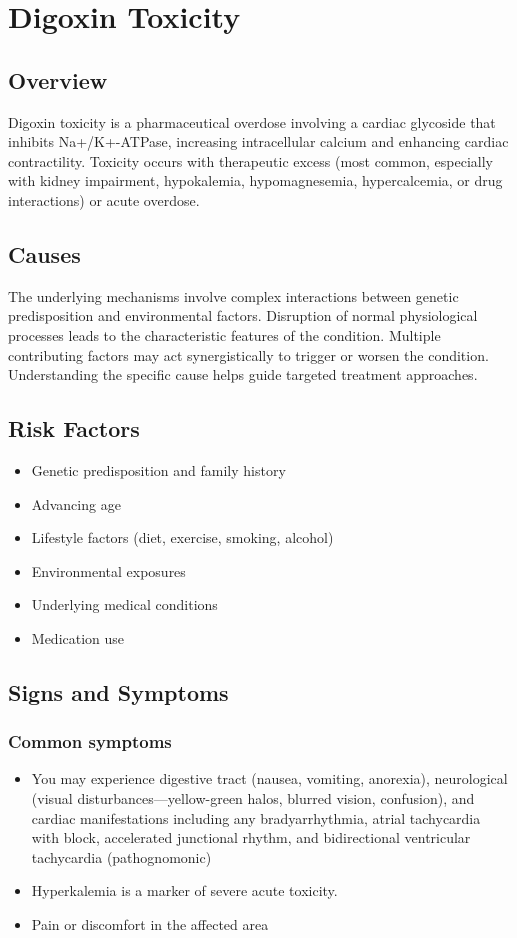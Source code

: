 \chapter{Digoxin Toxicity}
\label{sec:Digoxin Toxicity}

\section{Overview}
Digoxin toxicity is a pharmaceutical overdose involving a cardiac glycoside that inhibits Na+/K+-ATPase, increasing intracellular calcium and enhancing cardiac contractility. Toxicity occurs with therapeutic excess (most common, especially with kidney impairment, hypokalemia, hypomagnesemia, hypercalcemia, or drug interactions) or acute overdose.
\section{Causes}
The underlying mechanisms involve complex interactions between genetic predisposition and environmental factors. Disruption of normal physiological processes leads to the characteristic features of the condition. Multiple contributing factors may act synergistically to trigger or worsen the condition. Understanding the specific cause helps guide targeted treatment approaches.
\section{Risk Factors}


\begin{itemize}[noitemsep]
  \item Genetic predisposition and family history
  \item Advancing age
  \item Lifestyle factors (diet, exercise, smoking, alcohol)
  \item Environmental exposures
  \item Underlying medical conditions
  \item Medication use
\end{itemize}
\section{Signs and Symptoms}

\subsection{Common symptoms}
\begin{itemize}[noitemsep]
  \item You may experience digestive tract (nausea, vomiting, anorexia), neurological (visual disturbances---yellow-green halos, blurred vision, confusion), and cardiac manifestations including any bradyarrhythmia, atrial tachycardia with block, accelerated junctional rhythm, and bidirectional ventricular tachycardia (pathognomonic)
  \item Hyperkalemia is a marker of severe acute toxicity.
  \item Pain or discomfort in the affected area
  \end{itemize}

